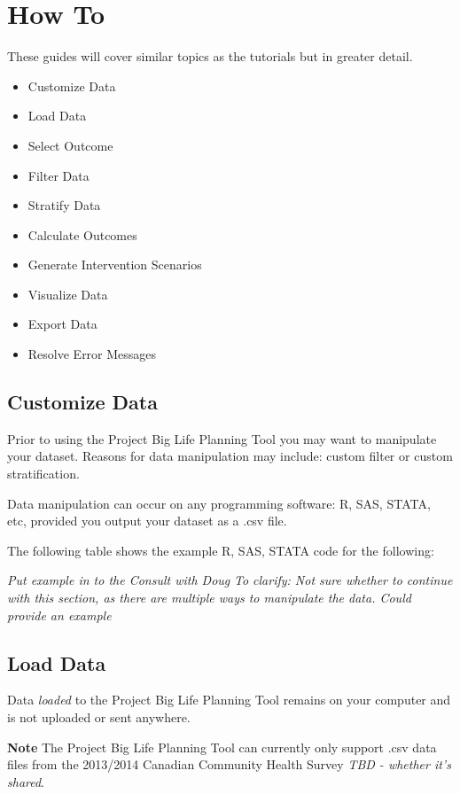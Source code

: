 \documentclass[]{book}
\providecommand{\tightlist}{%
  \setlength{\itemsep}{0pt}\setlength{\parskip}{0pt}}
\begin{document}
\chapter{How To}\label{howto}

These guides will cover similar topics as the tutorials but in greater
detail.

\begin{itemize}
\tightlist
\item
  Customize Data
\item
  Load Data
\item
  Select Outcome
\item
  Filter Data
\item
  Stratify Data
\item
  Calculate Outcomes
\item
  Generate Intervention Scenarios
\item
  Visualize Data
\item
  Export Data
\item
  Resolve Error Messages
\end{itemize}

\section{Customize Data}\label{customize-data}

Prior to using the Project Big Life Planning Tool you may want to
manipulate your dataset. Reasons for data manipulation may include:
custom filter or custom stratification.

Data manipulation can occur on any programming software: R, SAS, STATA,
etc, provided you output your dataset as a .csv file.

The following table shows the example R, SAS, STATA code for the
following:

\emph{Put example in to the Consult with Doug} \emph{To clarify: Not
sure whether to continue with this section, as there are multiple ways
to manipulate the data. Could provide an example}

\section{Load Data}\label{load-data}

Data \emph{loaded} to the Project Big Life Planning Tool remains on your
computer and is not uploaded or sent anywhere.

\textbf{Note} The Project Big Life Planning Tool can currently only
support .csv data files from the 2013/2014 Canadian Community Health
Survey \emph{TBD - whether it's shared}.
\end{document}

